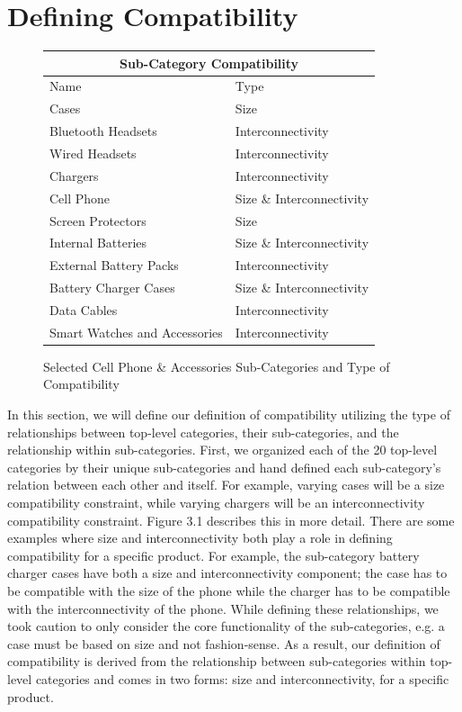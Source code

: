 \section{Defining Compatibility}

\begin{figure}[h!]
\begin{tabular}{ |p{6cm}|p{3cm}| }
 \hline
 \multicolumn{2}{|c|}{Sub-Category Compatibility} \\
 \hline
 Name & Type \\
 \hline
 Cases & Size \\
 Bluetooth Headsets & Interconnectivity \\
 Wired Headsets & Interconnectivity \\
 Chargers & Interconnectivity \\
 Cell Phone & Size \& Interconnectivity \\
 Screen Protectors & Size \\
 Internal Batteries & Size \& Interconnectivity \\
 External Battery Packs & Interconnectivity \\
 Battery Charger Cases & Size \& Interconnectivity \\
 Data Cables & Interconnectivity \\
 Smart Watches and Accessories & Interconnectivity \\
 \hline
\end{tabular}
\caption{Selected Cell Phone \& Accessories Sub-Categories and Type of Compatibility}
\end{figure}

In this section, we will define our definition of compatibility utilizing the type of relationships between top-level categories, their sub-categories, and the relationship within sub-categories. First, we organized each of the 20 top-level categories by their unique sub-categories and hand defined each sub-category's relation between each other and itself. For example, varying cases will be a size compatibility constraint, while varying chargers will be an interconnectivity compatibility constraint. Figure 3.1 describes this in more detail. There are some examples where size and interconnectivity both play a role in defining compatibility for a specific product. For example, the sub-category battery charger cases have both a size and interconnectivity component; the case has to be compatible with the size of the phone while the charger has to be compatible with the interconnectivity of the phone. While defining these relationships, we took caution to only consider the core functionality of the sub-categories, e.g. a case must be based on size and not fashion-sense. As a result, our definition of compatibility is derived from the relationship between sub-categories within top-level categories and comes in two forms: size and interconnectivity, for a specific product.

